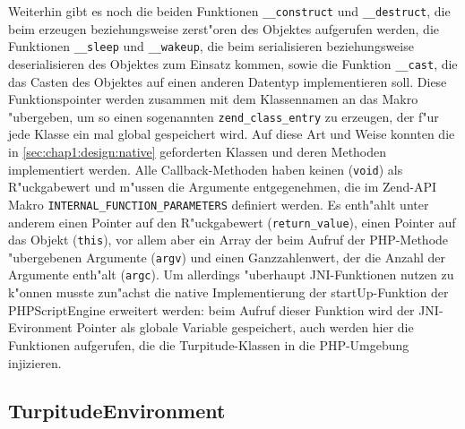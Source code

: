 Weiterhin gibt es noch die beiden Funktionen
\texttt{\_\_construct} und \texttt{\_\_destruct}, die beim erzeugen beziehungsweise zerst"oren des Objektes aufgerufen werden,
die Funktionen \texttt{\_\_sleep} und \texttt{\_\_wakeup}, die beim serialisieren beziehungsweise deserialisieren des Objektes zum
Einsatz kommen, sowie die Funktion \texttt{\_\_cast}, die das Casten des Objektes auf einen anderen Datentyp implementieren soll.
Diese Funktionspointer werden zusammen mit dem Klassennamen an das Makro "ubergeben, um so einen sogenannten \texttt{zend\_class\_entry}
zu erzeugen, der f"ur jede Klasse ein mal global gespeichert wird.
Auf diese Art und Weise konnten die in 
\ref{sec:chap1:design:native} geforderten Klassen und deren Methoden implementiert werden. Alle Callback-Methoden haben keinen (\texttt{void})
als R"uckgabewert und m"ussen die Argumente entgegenehmen, die im Zend-API Makro \texttt{INTERNAL\_FUNCTION\_PARAMETERS} definiert werden.
Es enth"ahlt unter anderem einen Pointer auf den R"uckgabewert (\texttt{return\_value}), einen Pointer auf das Objekt (\texttt{this}), vor
allem aber ein Array der beim Aufruf der PHP-Methode "ubergebenen Argumente (\texttt{argv}) und einen Ganzzahlenwert, der die Anzahl
der Argumente enth"alt (\texttt{argc}).
Um allerdings "uberhaupt JNI-Funktionen nutzen zu k"onnen musste zun"achst die native Implementierung der startUp-Funktion der PHPScriptEngine 
erweitert werden: beim Aufruf dieser Funktion
wird der JNI-Evironment Pointer als globale Variable gespeichert, auch werden hier die Funktionen aufgerufen, die die Turpitude-Klassen
in die PHP-Umgebung injizieren.

\subsection{TurpitudeEnvironment}
\label{sec:chap1:impl:3}

